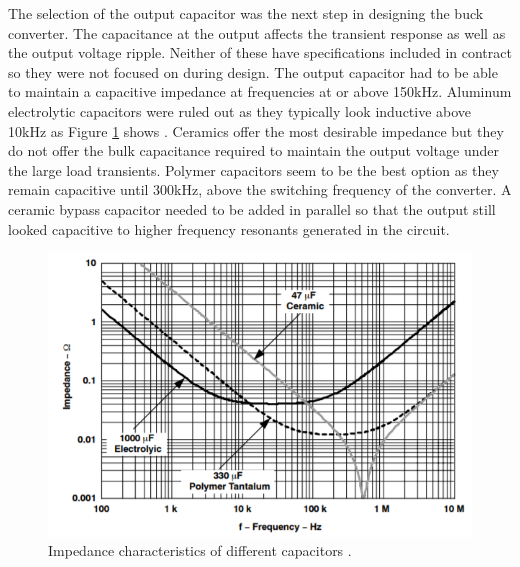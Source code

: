 \documentclass[11pt]{article}
\begin{document}
    \newline
    \newline 
    \noindent The selection of the output capacitor was the next step in designing the buck converter. The capacitance at the output affects the transient response as well as the output voltage ripple. Neither of these have specifications included in contract so they were not focused on during design. The output capacitor had to be able to maintain a capacitive impedance at frequencies at or above 150kHz. Aluminum electrolytic capacitors were ruled out as they typically look inductive above 10kHz as Figure \ref{capacitors1} shows \cite{kemet_charged_single-ended_2017}. Ceramics offer the most desirable impedance but they do not offer the bulk capacitance required to maintain the output voltage under the large load transients. Polymer capacitors seem to be the best option as they remain capacitive until 300kHz, above the switching frequency of the converter. A ceramic bypass capacitor needed to be added in parallel so that the output still looked capacitive to higher frequency resonants generated in the circuit.
    
    \begin{figure}[H]
            \centering
            \includegraphics[width=0.5\linewidth]{capacitors.PNG}
            \caption{Impedance characteristics of different capacitors \cite{jason_arrigo_input_2006}.}
            \label{capacitors1}
    \end{figure}
    
\end{document}

